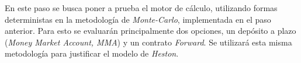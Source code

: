 \noindent En este paso se busca poner a prueba el motor de cálculo, utilizando formas deterministas en la metodología de \textit{Monte-Carlo}, implementada en el paso anterior. Para esto se evaluarán principalmente dos opciones, un depósito a plazo (\textit{Money Market Account, MMA}) y un contrato \textit{Forward}. Se utilizará esta misma metodología para justificar el modelo de \textit{Heston}.

